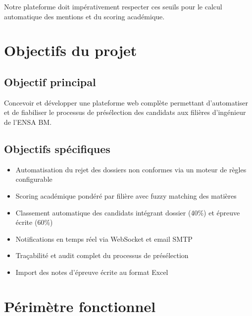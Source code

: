 Notre plateforme doit impérativement respecter ces seuils pour le calcul automatique des mentions et du scoring académique.

\section{Objectifs du projet}
\label{objectifs-du-projet}

\subsection{Objectif principal}
\label{objectif-principal}

Concevoir et développer une plateforme web complète permettant d'automatiser et de fiabiliser le processus de présélection des candidats aux filières d'ingénieur de l'ENSA BM.

\subsection{Objectifs spécifiques}
\label{objectifs-specifiques}

\begin{itemize}
  \item Automatisation du rejet des dossiers non conformes via un moteur de règles configurable
  \item Scoring académique pondéré par filière avec fuzzy matching des matières
  \item Classement automatique des candidats intégrant dossier (40\%) et épreuve écrite (60\%)
  \item Notifications en temps réel via WebSocket et email SMTP
  \item Traçabilité et audit complet du processus de présélection
  \item Import des notes d'épreuve écrite au format Excel
\end{itemize}

\section{Périmètre fonctionnel}
\label{perimetre-fonctionnel}

